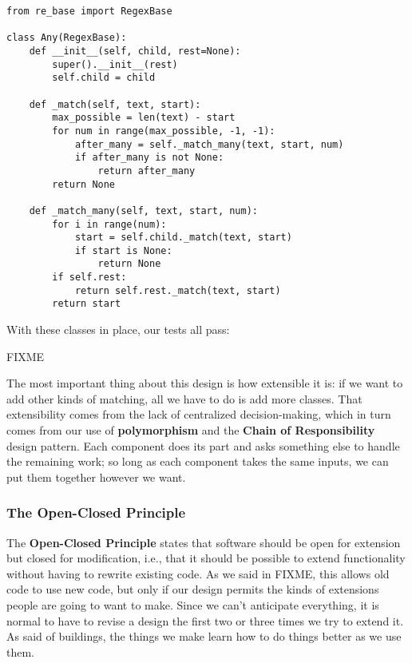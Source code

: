 \documentclass{scrbook}
\newcommand{\glossref}[1]{\textbf{#1}}
\begin{document}
\begin{lstlisting}[frame=single,frameround=tttt]
from re_base import RegexBase

class Any(RegexBase):
    def __init__(self, child, rest=None):
        super().__init__(rest)
        self.child = child

    def _match(self, text, start):
        max_possible = len(text) - start
        for num in range(max_possible, -1, -1):
            after_many = self._match_many(text, start, num)
            if after_many is not None:
                return after_many
        return None

    def _match_many(self, text, start, num):
        for i in range(num):
            start = self.child._match(text, start)
            if start is None:
                return None
        if self.rest:
            return self.rest._match(text, start)
        return start
\end{lstlisting}



With these classes in place,
our tests all pass:


FIXME


The most important thing about this design is how extensible it is:
if we want to add other kinds of matching,
all we have to do is add more classes.
That extensibility comes from the lack of centralized decision-making,
which in turn comes from our use of \glossref{polymorphism}
and the \glossref{Chain of Responsibility} design pattern.
Each component does its part and asks something else to handle the remaining work;
so long as each component takes the same inputs,
we can put them together however we want.

\begin{callout}


\subsubsection*{The Open-Closed Principle}


The \glossref{Open-Closed Principle} states that
software should be open for extension but closed for modification,
i.e., that it should be possible to extend functionality
without having to rewrite existing code.
As we said in FIXME,
this allows old code to use new code,
but only if our design permits the kinds of extensions people are going to want to make.
Since we can't anticipate everything,
it is normal to have to revise a design the first two or three times we try to extend it.
As \cite{Brand1995} said of buildings,
the things we make learn how to do things better as we use them.

\end{callout}
\end{document}
